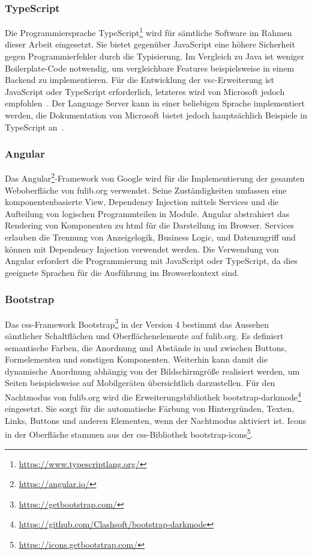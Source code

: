 \subsubsection{TypeScript}
Die Programmiersprache TypeScript\footnote{\url{https://www.typescriptlang.org/}} wird für sämtliche Software im Rahmen dieser Arbeit eingesetzt.
Sie bietet gegenüber JavaScript eine höhere Sicherheit gegen Programmierfehler durch die Typisierung.
Im Vergleich zu Java ist weniger Boilerplate-Code notwendig, um vergleichbare Features beispielsweise in einem Backend zu implementieren.
Für die Entwicklung der \ac{vsc}-Erweiterung ist JavaScript oder TypeScript erforderlich, letzteres wird von Microsoft jedoch empfohlen~\cite{vsc-first-extension}.
Der Language Server kann in einer beliebigen Sprache implementiert werden, die Dokumentation von Microsoft bietet jedoch hauptsächlich Beispiele in TypeScript an~\cite{vsc-language-server-guide}.

\subsubsection{Angular}
Das Angular\footnote{\url{https://angular.io/}}-Framework von Google wird für die Implementierung der gesamten Weboberfläche von fulib.org verwendet.
Seine Zuständigkeiten umfassen eine komponentenbasierte View, Dependency Injection mittels Services und die Aufteilung von logischen Programmteilen in Module.
Angular abstrahiert das Rendering von Komponenten zu \ac{html} für die Darstellung im Browser.
Services erlauben die Trennung von Anzeigelogik, Business Logic, und Datenzugriff und können mit Dependency Injection verwendet werden.
Die Verwendung von Angular erfordert die Programmierung mit JavaScript oder TypeScript, da dies geeignete Sprachen für die Ausführung im Browserkontext sind.

\subsubsection{Bootstrap}
Das \ac{css}-Framework Bootstrap\footnote{\url{https://getbootstrap.com/}} in der Version 4 bestimmt das Aussehen sämtlicher Schaltflächen und Oberflächenelemente auf fulib.org.
Es definiert semantische Farben, die Anordnung und Abstände in und zwischen Buttons, Formelementen und sonstigen Komponenten.
Weiterhin kann damit die dynamische Anordnung abhängig von der Bildschirmgröße realisiert werden, um Seiten beispielsweise auf Mobilgeräten übersichtlich darzustellen.
Für den Nachtmodus von fulib.org wird die Erweiterungsbibliothek bootstrap-darkmode\footnote{\url{https://github.com/Clashsoft/bootstrap-darkmode}} eingesetzt.
Sie sorgt für die automatische Färbung von Hintergründen, Texten, Links, Buttons und anderen Elementen, wenn der Nachtmodus aktiviert ist.
Icons in der Oberfläche stammen aus der \ac{css}-Bibliothek bootstrap-icons\footnote{\url{https://icons.getbootstrap.com/}}.

